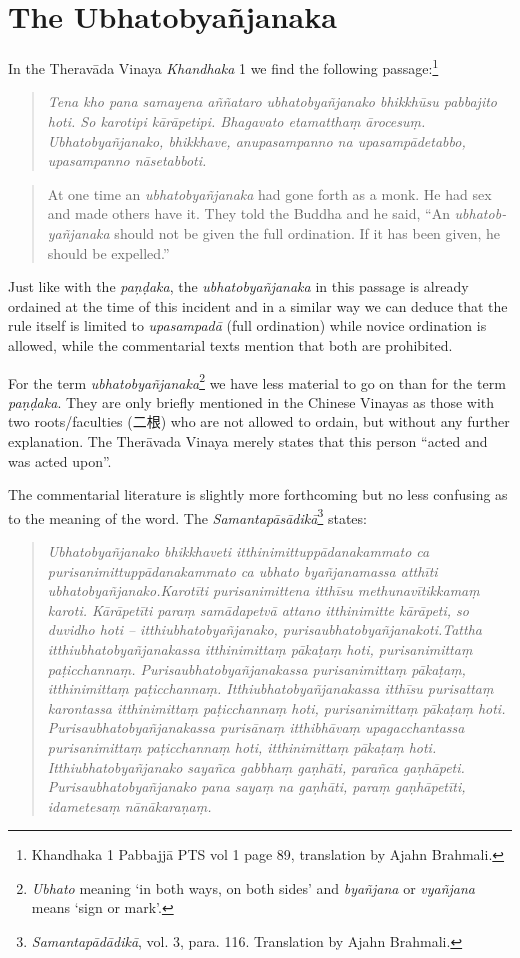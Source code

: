 \section{The Ubhatob­yañ­janaka}
In the Theravāda Vinaya {\em Khandhaka} 1 we find the following passage:\footnote{Khandhaka 1 Pabbajjā PTS vol 1 page 89, translation by Ajahn Brahmali.}

\begin{quote}
{\em Tena kho pana samayena aññataro ubhatobyañjanako bhikkhūsu pabbajito hoti. So karotipi kārāpetipi. Bhagavato etamatthaṃ ārocesuṃ. Ubhatobyañjanako, bhikkhave, anupasampanno na upasampādetabbo, upasampanno nāsetabboti.}
\end{quote}

\begin{quote}
At one time an {\em ubhatob­yañ­janaka} had gone forth as a monk. He had sex and made others have it. They told the Buddha and he said, “An {\em ubhatob­yañ­janaka} should not be given the full ordination. If it has been given, he should be expelled.”
\end{quote}

Just like with the {\em paṇḍaka}, the {\em ubhatob­yañ­janaka} in this passage is already ordained at the time of this incident and in a similar way we can deduce that the rule itself is limited to {\em upasampadā} (full ordination) while novice ordination is allowed, while the commentarial texts mention that both are prohibited.

For the term {\em ubhatob­yañ­janaka}\footnote{{\em Ubhato} meaning `in both ways, on both sides' and {\em byañjana} or {\em vyañjana} means `sign or mark'.} we have less material to go on than for the term {\em paṇḍaka}. They are only briefly mentioned in the Chinese Vinayas as those with two roots/faculties (二根) who are not allowed to ordain, but without any further explanation. The Therāvada Vinaya merely states that this person ``acted and was acted upon''. 

The commentarial literature is slightly more forthcoming but no less confusing as to the meaning of the word. The {\em Samantapāsādikā}\footnote{{\em Samantapādādikā}, vol. 3, para. 116. Translation by Ajahn Brahmali.} states:

\begin{quote}
{\em Ubhatobyañjanako bhikkhaveti itthinimittuppādanakammato ca purisanimittuppādanakammato ca ubhato byañjanamassa atthīti ubhatobyañjanako.Karotīti purisanimittena itthīsu methunavītikkamaṃ karoti. Kārāpetīti paraṃ samādapetvā attano itthinimitte kārāpeti, so duvidho hoti – itthiubhatobyañjanako, purisaubhatobyañjanakoti.Tattha itthiubhatobyañjanakassa itthinimittaṃ pākaṭaṃ hoti, purisanimittaṃ paṭicchannaṃ. Purisaubhatobyañjanakassa purisanimittaṃ pākaṭaṃ, itthinimittaṃ paṭicchannaṃ. Itthiubhatobyañjanakassa itthīsu purisattaṃ karontassa itthinimittaṃ paṭicchannaṃ hoti, purisanimittaṃ pākaṭaṃ hoti. Purisaubhatobyañjanakassa purisānaṃ itthibhāvaṃ upagacchantassa purisanimittaṃ paṭicchannaṃ hoti, itthinimittaṃ pākaṭaṃ hoti. Itthiubhatobyañjanako sayañca gabbhaṃ gaṇhāti, parañca gaṇhāpeti. Purisaubhatobyañjanako pana sayaṃ na gaṇhāti, paraṃ gaṇhāpetīti, idametesaṃ nānākaraṇaṃ.}
\end{quote}

